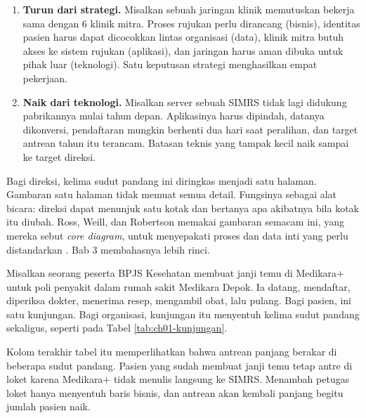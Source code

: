 \begin{enumerate}
  \item \textbf{Turun dari strategi.} Misalkan sebuah jaringan klinik
        memutuskan bekerja sama dengan 6 klinik mitra. Proses rujukan perlu
        dirancang (bisnis), identitas pasien harus dapat dicocokkan lintas
        organisasi (data), klinik mitra butuh akses ke sistem rujukan
        (aplikasi), dan jaringan harus aman dibuka untuk pihak luar
        (teknologi). Satu keputusan strategi menghasilkan empat pekerjaan.
  \item \textbf{Naik dari teknologi.} Misalkan server sebuah SIMRS tidak lagi
        didukung pabrikannya mulai tahun depan. Aplikasinya harus dipindah,
        datanya dikonversi, pendaftaran mungkin berhenti dua hari saat
        peralihan, dan target antrean tahun itu terancam. Batasan teknis yang
        tampak kecil naik sampai ke target direksi.
\end{enumerate}

Bagi direksi, kelima sudut pandang ini diringkas menjadi satu halaman.
Gambaran satu halaman tidak memuat semua detail. Fungsinya sebagai alat
bicara: direksi dapat menunjuk satu kotak dan bertanya apa akibatnya bila
kotak itu diubah. Ross, Weill, dan Robertson memakai gambaran semacam ini,
yang mereka sebut \textit{core diagram}, untuk menyepakati proses dan data
inti yang perlu distandarkan \cite{ross2006}. Bab 3 membahasnya lebih rinci.

\begin{kasus}[title={Kasus Medikara Health: Satu Kunjungan, Lima Sudut Pandang}]
  Misalkan seorang peserta BPJS Kesehatan membuat janji temu di Medikara+ untuk
  poli penyakit dalam rumah sakit Medikara Depok. Ia datang, mendaftar,
  diperiksa dokter, menerima resep, mengambil obat, lalu pulang. Bagi pasien,
  ini satu kunjungan. Bagi organisasi, kunjungan itu menyentuh kelima sudut
  pandang sekaligus, seperti pada Tabel \ref{tab:ch01-kunjungan}.

  Kolom terakhir tabel itu memperlihatkan bahwa antrean panjang berakar di
  beberapa sudut pandang. Pasien yang sudah membuat janji temu tetap antre di
  loket karena Medikara+ tidak menulis langsung ke SIMRS. Menambah petugas
  loket hanya menyentuh baris bisnis, dan antrean akan kembali panjang begitu
  jumlah pasien naik.
\end{kasus}

